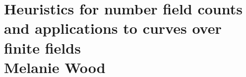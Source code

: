 \chapter{Heuristics for number field counts and applications to curves over finite fields \\ Melanie Wood}\label{ch:17}